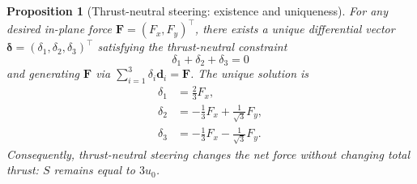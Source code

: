 \documentclass[10pt,a4paper]{amsart}
\newtheorem{proposition}{Proposition}
\begin{document}
\begin{proposition}[Thrust-neutral steering: existence and uniqueness]
\label{prop:thrust_neutral_unique}
For any desired in-plane force $\mathbf F = (F_x, F_y)^\top$, there exists a \emph{unique} 
differential vector $\bm\delta = (\delta_1, \delta_2, \delta_3)^\top$ satisfying the 
\emph{thrust-neutral constraint}
\begin{equation}
\delta_1 + \delta_2 + \delta_3 = 0
\label{eq:thrust_neutral}
\end{equation}
and generating $\mathbf F$ via $\sum_{i=1}^{3} \delta_i \mathbf d_i = \mathbf F$. 
The unique solution is
\begin{align}
\delta_1 &= \tfrac{2}{3} F_x, \label{eq:delta1} \\
\delta_2 &= -\tfrac{1}{3} F_x + \tfrac{1}{\sqrt{3}} F_y, \label{eq:delta2} \\
\delta_3 &= -\tfrac{1}{3} F_x - \tfrac{1}{\sqrt{3}} F_y. \label{eq:delta3}
\end{align}
Consequently, thrust-neutral steering changes the net force without changing total thrust: 
$S$ remains equal to $3u_0$.
\end{proposition}
\end{document}

